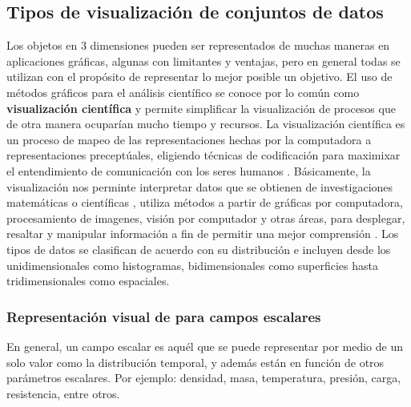 \documentclass[11pt,letterpaper]{article}     %
\begin{document}
\subsection{Tipos de visualizaci\' on de conjuntos de datos}
Los objetos en 3 dimensiones pueden ser representados de muchas maneras en aplicaciones gr\' aficas, algunas con limitantes y ventajas, pero en general todas se utilizan con el prop\' osito de representar lo mejor posible un objetivo. El uso  de m\' etodos gr\' aficos para el an\' alisis cient\' ifico se conoce por lo com\' un como \textbf{visualizaci\' on cient\' ifica} y permite simplificar la visualizaci\' on de procesos que de otra manera ocupar\' ian mucho tiempo y recursos. 
La visualizaci\' on cient\' ifica es un proceso de mapeo de las representaciones hechas por la computadora a representaciones precept\' uales, eligiendo t\' ecnicas de codificaci\' on para maximixar el entendimiento de comunicaci\' on con los seres humanos \cite{Tesis Americas Puebla Visualizacion}. B\' asicamente, la visualizaci\' on nos perminte interpretar datos que se obtienen de investigaciones matem\' aticas o cient\' ificas \cite{scottowen}, utiliza m\' etodos a partir de gr\' aficas por computadora, procesamiento de imagenes, visi\' on por computador y otras \' areas, para desplegar, resaltar y manipular informaci\' on a fin de permitir una mejor comprensi\' on \cite{Donald Hearn y M. Pauline Baker}.
Los tipos de datos se clasifican de acuerdo con su distribuci\' on e incluyen desde los unidimensionales como histogramas, bidimensionales como superficies hasta tridimensionales como espaciales.

\subsubsection{Representaci\' on visual de para campos escalares}
En general, un campo escalar es aqu\' el que se puede representar por medio de un solo valor como la distribuci\' on temporal, y adem\' as est\' an en funci\' on de otros par\' ametros escalares. Por ejemplo: densidad, masa, temperatura, presi\' on, carga, resistencia, entre otros.
\end{document}
